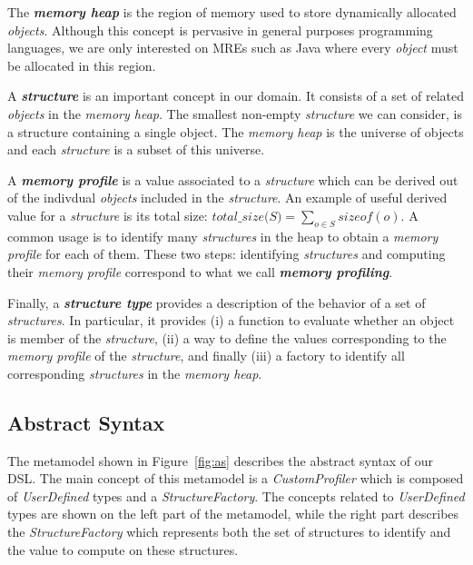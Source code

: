 The \textbf{\textit{memory heap}} is the region of memory used to store dynamically allocated \textit{objects}.
Although this concept is pervasive in general purposes programming languages, we are only interested on MREs such as Java where every \textit{object} must be allocated in this region.

A \textbf{\textit{structure}} is an important concept in our domain.
It consists of a set of related \textit{objects} in the \textit{memory heap}.
The smallest non-empty \textit{structure} we can consider, is a structure containing a single object.
The \textit{memory heap} is the universe of objects and each \textit{structure} is a subset of this universe.

A \textbf{\textit{memory profile}} is a value associated to a \textit{structure} which can be derived out of the indivdual \textit{objects} included in the \textit{structure}. 
An example of useful derived value for a \textit{structure} is its total size: $\textit{total\_size(S)} = \sum_{o \in S} {sizeof(o)}$.
A common usage is to identify many \textit{structures} in the heap to obtain a \textit{memory profile} for each of them.
These two steps: identifying \textit{structures} and computing their \textit{memory profile} correspond to what we call \textbf{\textit{memory profiling}}. 

Finally, a \textbf{\textit{structure type}} provides a description of the behavior of a set of \textit{structures}. 
In particular, it provides (i) a function to evaluate whether an object is member of the \textit{structure}, (ii) a way to define the values corresponding to the \textit{memory profile} of the \textit{structure}, and finally (iii) a factory to identify all  corresponding \textit{structures} in the \textit{memory heap}.

\subsection{Abstract Syntax}\label{sec:abstract-syntax}

The metamodel shown in Figure~\ref{fig:as} describes the abstract syntax of our DSL.
The main concept of this metamodel is a \textit{CustomProfiler} which is composed of \textit{UserDefined} types and a \textit{StructureFactory}.
The concepts related to \textit{UserDefined} types are shown on the left part of the metamodel, while the right part describes the \textit{StructureFactory} which represents both the set of  structures to identify and the value to compute on these structures.

